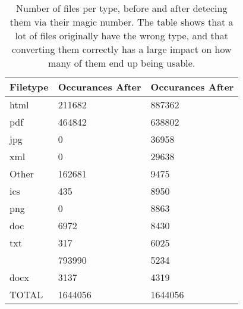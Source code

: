 \begin{table}[ht]
\centering
\begin{tabular}{lll}
  \hline
Filetype & Occurances After & Occurances After \\ 
  \hline
html & 211682 & 887362 \\ 
  pdf & 464842 & 638802 \\ 
  jpg & 0 & 36958 \\ 
  xml & 0 & 29638 \\ 
  Other & 162681 & 9475 \\ 
  ics & 435 & 8950 \\ 
  png & 0 & 8863 \\ 
  doc & 6972 & 8430 \\ 
  txt & 317 & 6025 \\ 
   & 793990 & 5234 \\ 
  docx & 3137 & 4319 \\ 
  TOTAL & 1644056 & 1644056 \\ 
   \hline
\end{tabular}
\caption{Number of files per type, before and after detecing them via their magic number. The table shows that a lot of files originally have the wrong type, and that converting them correctly has a large impact on how many of them end up being usable.} 
\end{table}

